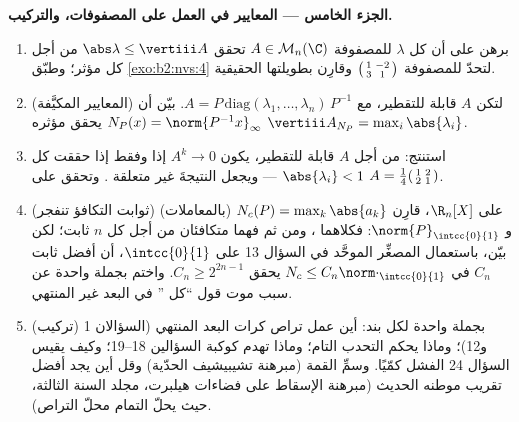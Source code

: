 \begin{problem}
\medskip
\noindent\textbf{الجزء الخامس --- المعايير في العمل على المصفوفات،
والتركيب.}
\begin{enumerate}[resume]
  \item برهن على أن كل  $\lambda$ للمصفوفة $A \in
        \mathcal{M}_n(\C)$ تحقق $\abs\lambda \leq
        \vertiii A$ من أجل كل  مؤثر؛ وطبّق
        \cref{exo:b2:nvs:4} لتحدّ  للمصفوفة
        $\begin{psmallmatrix}1 & -2\\ 3 & 1\end{psmallmatrix}$
        وقارِن بطويلتها الحقيقية.
  \item (المعايير المكيَّفة) لتكن $A$ قابلة للتقطير، مع $A =
        P\,\mathrm{diag}(\lambda_1, \dots, \lambda_n)\,P^{-1}$.
        بيّن أن $N_P(x) = \norm{P^{-1}x}_\infty$  يحقق 
        مؤثره $\vertiii A_{N_P} =
        \max_i\abs{\lambda_i}$.
  \item استنتج: من أجل $A$ قابلة للتقطير، يكون $A^k \to 0$ إذا وفقط
        إذا حققت كل  $\abs{\lambda_i} < 1$ ---
        ويجعل  النتيجةَ
        غير متعلقة . وتحقق على $A =
        \frac14\begin{psmallmatrix}1 & 2\\ 2 &
        1\end{psmallmatrix}$.
  \item (ثوابت التكافؤ تنفجر) على $\R_n[X]$، قارِن
        $N_c(P) = \max_k \abs{a_k}$ (بالمعاملات) و
        $\norm{P}_{\intcc{0}{1}}$: فكلاهما ، ومن ثم فهما
        متكافئان من أجل كل $n$ ثابت؛ لكن بيّن، باستعمال المصغِّر
        الموحَّد في السؤال 13 على $\intcc{0}{1}$، أن
        أفضل ثابت $C_n$ في $N_c \leq
        C_n\norm\cdot_{\intcc{0}{1}}$ يحقق $C_n \geq
        2^{2n-1}$. واختم بجملة واحدة عن سبب موت قول ``كل '' في البعد غير المنتهي.
  \item (تركيب) بجملة واحدة لكل بند: أين عمل تراص
        كرات البعد المنتهي (السؤالان 1 و12)؛ وماذا يحكم
        التحدب التام؛ وماذا تهدم كوكبة
        السؤالين 18--19؛ وكيف يقيس السؤال 24
        الفشل كمّيًا. وسمِّ القمة (مبرهنة تشيبيشيف
        الحدّية) وقل أين يجد أفضل تقريب موطنه
        الحديث (مبرهنة الإسقاط على فضاءات هيلبرت،
        مجلد السنة الثالثة، حيث يحلّ التمام محلّ
        التراص).
\end{enumerate}
\end{problem}
